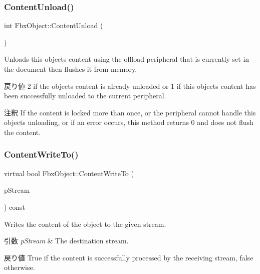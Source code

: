 \subsubsection{\texorpdfstring{Content\+Unload()}{ContentUnload()}}
{\footnotesize\ttfamily int Fbx\+Object\+::\+Content\+Unload (\begin{DoxyParamCaption}{ }\end{DoxyParamCaption})}

Unloads this object\textquotesingle{}s content using the offload peripheral that is currently set in the document then flushes it from memory. \begin{DoxyReturn}{戻り値}
2 if the object\textquotesingle{}s content is already unloaded or 1 if this object\textquotesingle{}s content has been successfully unloaded to the current peripheral.
\end{DoxyReturn}
\begin{DoxyRemark}{注釈}
If the content is locked more than once, or the peripheral cannot handle this object\textquotesingle{}s unloading, or if an error occurs, this method returns 0 and does not flush the content. 
\end{DoxyRemark}
\mbox{\label{class_fbx_object_ab8a59df9233cdfeaae05e5b6d15f5101}} 
\subsubsection{\texorpdfstring{Content\+Write\+To()}{ContentWriteTo()}}
{\footnotesize\ttfamily virtual bool Fbx\+Object\+::\+Content\+Write\+To (\begin{DoxyParamCaption}\item[{\hyperlink{class_fbx_stream}{Fbx\+Stream} \&}]{p\+Stream }\end{DoxyParamCaption}) const\hspace{0.3cm}{\ttfamily [virtual]}}

Writes the content of the object to the given stream. 
\begin{DoxyParams}{引数}
{\em p\+Stream} & The destination stream. \\
\hline
\end{DoxyParams}
\begin{DoxyReturn}{戻り値}
{\ttfamily True} if the content is successfully processed by the receiving stream, {\ttfamily false} otherwise. 
\end{DoxyReturn}


